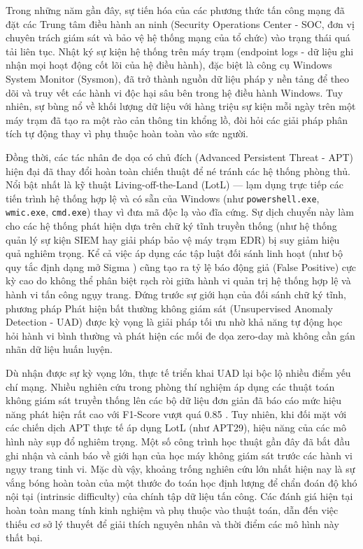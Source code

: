 \documentclass[../main.tex]{subfiles}
\begin{document}
\vspace{1em}

Trong những năm gần đây, sự tiến hóa của các phương thức tấn công mạng đã đặt các Trung tâm điều hành an ninh (Security Operations Center - SOC, đơn vị chuyên trách giám sát và bảo vệ hệ thống mạng của tổ chức) vào trạng thái quá tải liên tục. Nhật ký sự kiện hệ thống trên máy trạm (endpoint logs - dữ liệu ghi nhận mọi hoạt động cốt lõi của hệ điều hành), đặc biệt là công cụ Windows System Monitor (Sysmon), đã trở thành nguồn dữ liệu pháp y nền tảng để theo dõi và truy vết các hành vi độc hại sâu bên trong hệ điều hành Windows. Tuy nhiên, sự bùng nổ về khối lượng dữ liệu với hàng triệu sự kiện mỗi ngày trên một máy trạm đã tạo ra một rào cản thông tin khổng lồ, đòi hỏi các giải pháp phân tích tự động thay vì phụ thuộc hoàn toàn vào sức người.

Đồng thời, các tác nhân đe dọa có chủ đích (Advanced Persistent Threat - APT) hiện đại đã thay đổi hoàn toàn chiến thuật để né tránh các hệ thống phòng thủ. Nổi bật nhất là kỹ thuật Living-off-the-Land (LotL) — lạm dụng trực tiếp các tiến trình hệ thống hợp lệ và có sẵn của Windows (như \texttt{powershell.exe}, \texttt{wmic.exe}, \texttt{cmd.exe}) thay vì đưa mã độc lạ vào đĩa cứng. Sự dịch chuyển này làm cho các hệ thống phát hiện dựa trên chữ ký tĩnh truyền thống (như hệ thống quản lý sự kiện SIEM hay giải pháp bảo vệ máy trạm EDR) bị suy giảm hiệu quả nghiêm trọng. Kể cả việc áp dụng các tập luật đối sánh linh hoạt (như bộ quy tắc định dạng mở Sigma \cite{sigmahq2024}) cũng tạo ra tỷ lệ báo động giả (False Positive) cực kỳ cao do không thể phân biệt rạch ròi giữa hành vi quản trị hệ thống hợp lệ và hành vi tấn công ngụy trang. Đứng trước sự giới hạn của đối sánh chữ ký tĩnh, phương pháp Phát hiện bất thường không giám sát (Unsupervised Anomaly Detection - UAD) được kỳ vọng là giải pháp tối ưu nhờ khả năng tự động học hỏi hành vi bình thường và phát hiện các mối đe dọa zero-day mà không cần gán nhãn dữ liệu huấn luyện.

Dù nhận được sự kỳ vọng lớn, thực tế triển khai UAD lại bộc lộ nhiều điểm yếu chí mạng. Nhiều nghiên cứu trong phòng thí nghiệm áp dụng các thuật toán không giám sát truyền thống lên các bộ dữ liệu đơn giản đã báo cáo mức hiệu năng phát hiện rất cao với F1-Score vượt quá 0.85 \cite{ahmed2016survey, alsaheel2021atlas, han2020unicorn}. Tuy nhiên, khi đối mặt với các chiến dịch APT thực tế áp dụng LotL (như APT29), hiệu năng của các mô hình này sụp đổ nghiêm trọng. Một số công trình học thuật gần đây \cite{smiliotopoulos2025detection, ugea_lmd_2025} đã bắt đầu ghi nhận và cảnh báo về giới hạn của học máy không giám sát trước các hành vi ngụy trang tinh vi. Mặc dù vậy, khoảng trống nghiên cứu lớn nhất hiện nay là sự vắng bóng hoàn toàn của một thước đo toán học định lượng để chẩn đoán độ khó nội tại (intrinsic difficulty) của chính tập dữ liệu tấn công. Các đánh giá hiện tại hoàn toàn mang tính kinh nghiệm và phụ thuộc vào thuật toán, dẫn đến việc thiếu cơ sở lý thuyết để giải thích nguyên nhân và thời điểm các mô hình này thất bại. 
\end{document}
